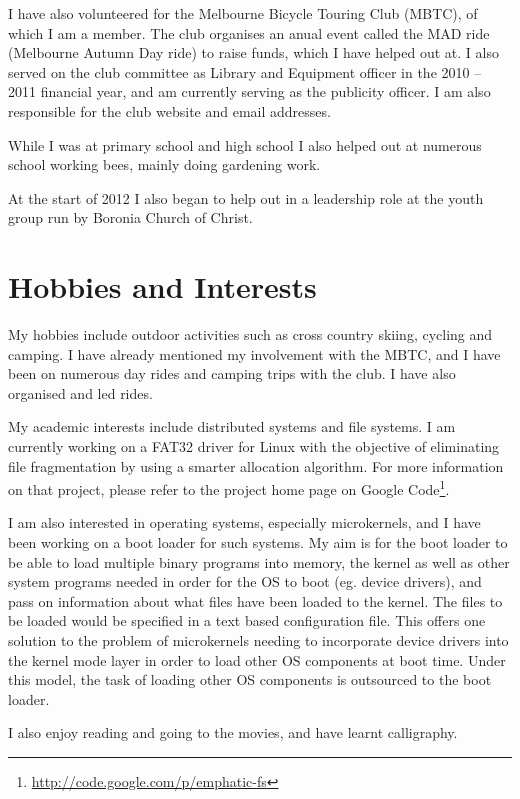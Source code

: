 \documentclass[a4paper]{article}
\begin{document}
I have also volunteered for the Melbourne Bicycle Touring Club (MBTC), of
which I am a member. The club organises an anual event called the MAD ride
(Melbourne Autumn Day ride) to raise funds, which I have helped out at. I
also served on the club committee as Library and Equipment officer in the
2010 -- 2011 financial year, and am currently serving as the publicity
officer. I am also responsible for the club website and email addresses.

While I was at primary school and high school I also helped out at
numerous school working bees, mainly doing gardening work.

At the start of 2012 I also began to help out in a leadership role at the
youth group run by Boronia Church of Christ.


\section{Hobbies and Interests}
My hobbies include outdoor activities such as cross country skiing, cycling
and camping. I have already mentioned my involvement with the MBTC, and I
have been on numerous day rides and camping trips with the club. I have
also organised and led rides.

My academic interests include distributed systems and file systems. I am
currently working on a FAT32 driver for Linux with the objective of
eliminating file fragmentation by using a smarter allocation algorithm.
For more information on that project, please refer to the project home
page on Google Code\footnote{
\href{http://code.google.com/p/emphatic-fs}{http://code.google.com/p/emphatic-fs}
}.

I am also interested in operating systems, especially microkernels, and I
have been working on a boot loader for such systems. My aim is for the
boot loader to be able to load multiple binary programs into memory, the
kernel as well as other system programs needed in order for the OS to
boot (eg. device drivers), and pass on information about what files
have been loaded to the kernel. The files to be loaded would be specified 
in a text based configuration file. This offers one solution to the problem 
of microkernels needing to incorporate device drivers into the kernel mode 
layer in order to load other OS components at boot time. Under this model, 
the task of loading other OS components is outsourced to the boot loader.

I also enjoy reading and going to the movies, and have learnt calligraphy.
\end{document}
